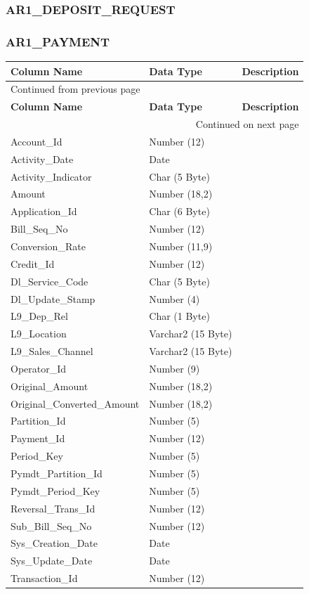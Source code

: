 \documentclass[12pt,twoside]{article}
\begin{document}
\subsubsection{AR1\_DEPOSIT\_REQUEST}
\label{sec:orgheadline94}
\newpage
\subsubsection{AR1\_PAYMENT}
\label{sec:orgheadline95}
\footnotesize

\begin{longtable}{l|l|l}
\hline
\textbf{Column Name} & \textbf{Data Type} & \textbf{Description}\\
\hline
\endfirsthead
\multicolumn{3}{l}{Continued from previous page} \\
\hline

\textbf{Column Name} & \textbf{Data Type} & \textbf{Description} \\

\hline
\endhead
\hline\multicolumn{3}{r}{Continued on next page} \\
\endfoot
\endlastfoot
\hline
Account\_Id & Number (12) & \\
Activity\_Date & Date & \\
Activity\_Indicator & Char (5 Byte) & \\
Amount & Number (18,2) & \\
Application\_Id & Char (6 Byte) & \\
Bill\_Seq\_No & Number (12) & \\
Conversion\_Rate & Number (11,9) & \\
Credit\_Id & Number (12) & \\
Dl\_Service\_Code & Char (5 Byte) & \\
Dl\_Update\_Stamp & Number (4) & \\
L9\_Dep\_Rel & Char (1 Byte) & \\
L9\_Location & Varchar2 (15 Byte) & \\
L9\_Sales\_Channel & Varchar2 (15 Byte) & \\
Operator\_Id & Number (9) & \\
Original\_Amount & Number (18,2) & \\
Original\_Converted\_Amount & Number (18,2) & \\
Partition\_Id & Number (5) & \\
Payment\_Id & Number (12) & \\
Period\_Key & Number (5) & \\
Pymdt\_Partition\_Id & Number (5) & \\
Pymdt\_Period\_Key & Number (5) & \\
Reversal\_Trans\_Id & Number (12) & \\
Sub\_Bill\_Seq\_No & Number (12) & \\
Sys\_Creation\_Date & Date & \\
Sys\_Update\_Date & Date & \\
Transaction\_Id & Number (12) & \\
\hline
\end{longtable}
\normalsize
\end{document}

